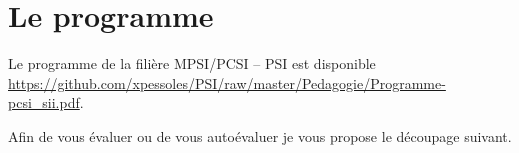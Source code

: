 \section{Le programme}
Le programme de la filière MPSI/PCSI -- PSI est disponible \url{https://github.com/xpessoles/PSI/raw/master/Pedagogie/Programme-pcsi_sii.pdf}. 

Afin de vous évaluer ou de vous autoévaluer je vous propose le découpage suivant.

\begin{multicols}{2}
\allCompWide
\end{multicols}